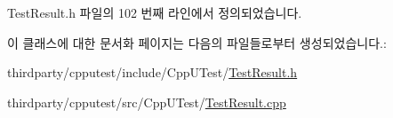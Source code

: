 Test\+Result.\+h 파일의 102 번째 라인에서 정의되었습니다.



이 클래스에 대한 문서화 페이지는 다음의 파일들로부터 생성되었습니다.\+:\begin{DoxyCompactItemize}
\item 
thirdparty/cpputest/include/\+Cpp\+U\+Test/\hyperlink{_test_result_8h}{Test\+Result.\+h}\item 
thirdparty/cpputest/src/\+Cpp\+U\+Test/\hyperlink{_test_result_8cpp}{Test\+Result.\+cpp}\end{DoxyCompactItemize}
